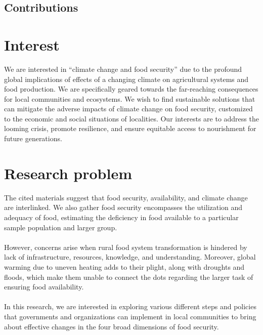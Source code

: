 \documentclass[12pt, twoside]{report}
\title{}
\author{Riddhiman}
\date{\monthyeardate\today}
\begin{document}



\begin{center}
    \section*{Contributions}%
\end{center}


\newpage 

\begin{multicols}{2}
\section*{Interest}
We are interested in ``climate change and food security'' due to the profound global implications of effects of a changing climate on agricultural systems and food production. We are specifically geared towards the far-reaching consequences for local communities and ecosystems. We wish to find sustainable solutions that can mitigate the adverse impacts of climate change on food security, customized to the economic and social situations of localities. Our interests are to address the looming crisis, promote resilience, and ensure equitable access to nourishment for future generations.


\section*{Research problem}
The cited materials suggest that food security, availability, and climate change are interlinked. We also gather food security encompasses the utilization and adequacy of food, estimating the deficiency in food available to a particular sample population and larger group. \\ \\ 
However, concerns arise when rural food system transformation is hindered by lack of infrastructure, resources, knowledge, and understanding. Moreover, global warming due to uneven heating adds to their plight, along with droughts and floods, which make them unable to connect the dots regarding the larger task of ensuring food availability. \\ \\
In this research, we are interested in exploring various different steps and policies that governments and organizations can implement in local communities to bring about effective changes in the four broad dimensions of food security.



\end{multicols}
\end{document}
